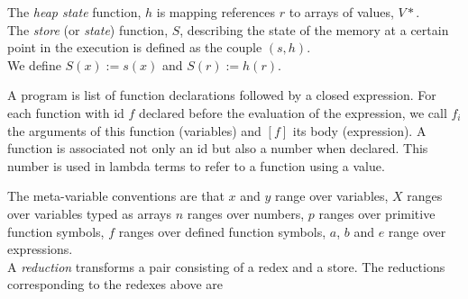 \documentclass[12pt,a4paper]{article}
\begin{document}
The \emph{heap state} function, $h$ is mapping references $r$ to arrays of values, $V*$.\\

The \emph{store} (or \emph{state}) function, $S$, describing the state of the memory at a certain point in the execution is defined as the couple $(s, h)$.\\
We define $S(x) := s(x)$ and $S(r) := h(r)$.

A program is list of function declarations followed by a closed expression. For each function with id $f$ declared before the evaluation of the expression, we call $f_i$ the arguments of this function (variables) and $[f]$ its body (expression). A function is associated not only an id but also a number when declared. This number is used in lambda terms to refer to a function using a value.

The meta-variable conventions are that $x$ and $y$ range over variables, $X$ ranges over variables typed as arrays $n$ ranges over numbers, $p$ ranges over primitive function symbols, $f$ ranges over defined function symbols, $a$, $b$ and $e$ range over expressions. \\

A \emph{reduction} transforms a pair consisting of a redex and a store. The reductions corresponding to the redexes above are
\end{document}
